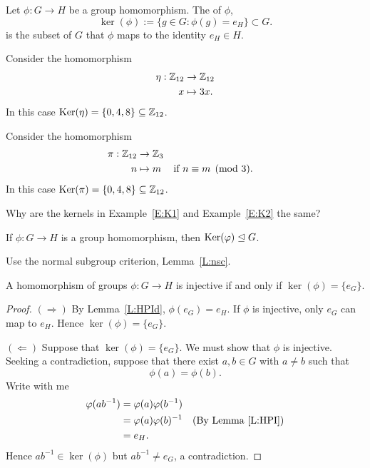 \documentclass{ximera}
\begin{document}
\begin{definition}
  Let $\phi:G\to H$ be a group homomorphism. The  of
  $\phi$,
  \[
  \ker(\phi) := \{g\in G: \phi(g) = e_H\}\subset G.
  \]
  is the subset of $G$ that $\phi$ maps to the identity $e_H\in H$.
\end{definition}

\begin{example}\label{E:K1}
  Consider the homomorphism
  \begin{align*}
    \eta:\Z_{12} &\to \Z_{12}\\
    x &\mapsto 3x.
  \end{align*}
  In this case $\ker(\eta) = \{0,4,8\}\subset \Z_{12}$.
\end{example}

\begin{example}\label{E:K2} 
  Consider the homomorphism
  \begin{align*}
    \pi:\Z_{12} &\to \Z_{3}\\
    n &\mapsto m & &\text{if $n\equiv m \pmod{3}$}.
  \end{align*}
  In this case $\ker(\pi) = \{0,4,8\}\subset \Z_{12}$.
\end{example}

\begin{exercise}
  Why are the kernels in Example~\ref{E:K1} and Example~\ref{E:K2} the
  same?
\end{exercise}



\begin{lemma}\label{L:kerN}
  If $\phi:G\to H$ is a group homomorphism, then $\ker(\phi)\normal G$.
  \begin{sketch}
    Use the normal subgroup criterion, Lemma~\ref{L:nsc}.
  \end{sketch}
\end{lemma}



\begin{lemma}\label{L:kerinj}
  A homomorphism of groups $\phi:G\to H$ is injective if and only if
  $\ker(\phi) = \{e_G\}$.
  \begin{proof}
    $(\Rightarrow)$ By Lemma~\ref{L:HPId}, $\phi(e_G) = e_H$. If
    $\phi$ is injective, only $e_G$ can map to $e_H$. Hence
    $\ker(\phi) = \{e_G\}$.


    $(\Leftarrow)$ Suppose that $\ker(\phi) = \{e_G\}$. We must show
    that $\phi$ is injective. Seeking a contradiction, suppose that
    there exist $a,b\in G$ with $a\ne b$ such that
    \[
    \phi(a) = \phi(b).
    \]
    Write with me
    \begin{align*}
      \phi(ab^{-1}) &=\phi(a)\phi(b^{-1})\\
      &= \phi(a) \phi(b)^{-1} & \text{(By Lemma~\ref{L:HPI})}\\
      &= e_H.
    \end{align*}
    Hence $ab^{-1}\in\ker(\phi)$ but $ab^{-1}\ne e_G$, a
    contradiction.
  \end{proof}
\end{lemma}
\end{document}
